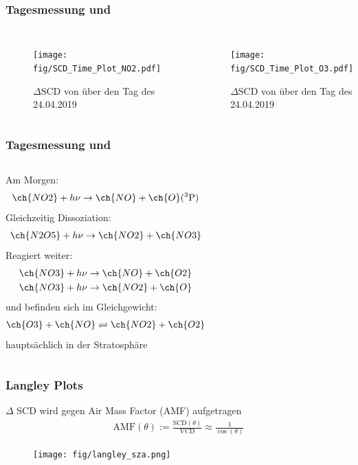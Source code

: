 \documentclass{beamer}
\begin{document}
\begin{frame}
    \frametitle{Tagesmessung  und }
	\begin{columns}
	  	\begin{figure}
	  		\texttt{[image: fig/SCD\_Time\_Plot\_NO2.pdf]}
    		\caption{$\Delta \text{SCD}$ von  über den Tag des 24.04.2019}
    		\label{fig:delta_SCD_time_NO2}
        \end{figure}
    	\begin{figure}
    		\texttt{[image: fig/SCD\_Time\_Plot\_O3.pdf]}
    		\caption{$\Delta \text{SCD}$ von  über den Tag des 24.04.2019}
    		\label{fig:delta_SCD_time_O3}
    	\end{figure}  		
    \end{columns}
\end{frame}

\begin{frame}
    \frametitle{Tagesmessung  und }
    \begin{columns}
    	Am Morgen:
    	\begin{align}
    		\ch{NO2} + h \nu \to \ch{NO} + \ch{O}(^3\text{P})
    	\end{align}
    \pause
    	Gleichzeitig Dissoziation:
    	\begin{align}
    		\ch{N2O5} + h \nu \to \ch{NO2} + \ch{NO3}
    	\end{align}
    \pause
    	Reagiert weiter:
    	\begin{align}
    		\ch{NO3} + h \nu \to \ch{NO} + \ch{O2}\\
    		\ch{NO3} + h \nu \to \ch{NO2} + \ch{O}
    	\end{align}
    \pause	
      	 und  befinden sich im Gleichgewicht:
      		\begin{align}
      			\ch{O3} + \ch{NO} \rightleftharpoons \ch{NO2} + \ch{O2}
      		\end{align}
      	 hauptsächlich in der Stratosphäre	
    \end{columns}
\end{frame}

\begin{frame}
    \frametitle{Langley Plots}
    $\Delta$ SCD wird gegen Air Mass Factor (AMF) aufgetragen\\
    \begin{align}
        \text{AMF}(\theta) := \frac{\text{SCD}(\theta)}{\text{VCD}} \approx \frac{1}{\cos (\theta)}
    \end{align}
    \begin{figure}
        \texttt{[image: fig/langley\_sza.png]}
    \end{figure}
\end{frame}
\end{document}
